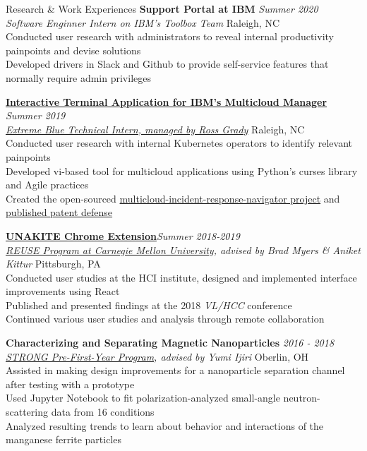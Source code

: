\documentclass{resume}
\begin{document}
\begin{rSection}{Research \& Work Experiences}
{\bf Support Portal at IBM} \hfill  {\em Summer 2020} \\
{\it Software Enginner Intern on IBM's Toolbox Team} \hfill { Raleigh, NC} \\
{Conducted user research with administrators to reveal internal productivity painpoints and devise solutions} \\
{Developed drivers in Slack and Github to provide self-service features that normally require admin privileges}

\href{https://github.com/IBM/multicloud-incident-response-navigator}{\bf Interactive Terminal Application for IBM's Multicloud Manager} \hfill  {\em Summer 2019} \\
\href{https://www.ibm.com/employment/extremeblue/index.html}{\em Extreme Blue Technical Intern, managed by Ross Grady} \hfill { Raleigh, NC} \\
{Conducted user research with internal Kubernetes operators to identify relevant painpoints} \\
Developed vi-based tool for multicloud applications using Python's curses library and Agile practices \\
{Created the open-sourced \href{https://github.com/IBM/multicloud-incident-response-navigator}{multicloud-incident-response-navigator project}} and \href{https://priorart.ip.com/IPCOM/000262660}{published patent defense}

{\bf \href{https://unakite.info/}{UNAKITE Chrome Extension}}\hfill {\em Summer 2018-2019} \\
{\em \href{https://www.cmu.edu/scs/isr/reuse/}{REUSE Program at Carnegie Mellon University}, advised by Brad Myers \& Aniket Kittur} \hfill { Pittsburgh, PA}\\
Conducted user studies at the HCI institute, designed and implemented interface improvements using React \\
Published and presented findings at the 2018 {\em VL/HCC} conference \\
Continued various user studies and analysis through remote collaboration

{\bf Characterizing and Separating Magnetic Nanoparticles } \hfill {\em 2016 - 2018}\\
{\em \href{https://www.oberlin.edu/undergraduate-research/programs/strong}{STRONG Pre-First-Year Program}, advised by Yumi Ijiri } \hfill { Oberlin, OH}\\
Assisted in making design improvements for a nanoparticle separation channel after testing with a prototype \\
Used Jupyter Notebook to fit polarization-analyzed small-angle neutron-scattering data from 16 conditions \\
Analyzed resulting trends to learn about behavior and interactions of the manganese ferrite particles 


\end{rSection}
\end{document}
